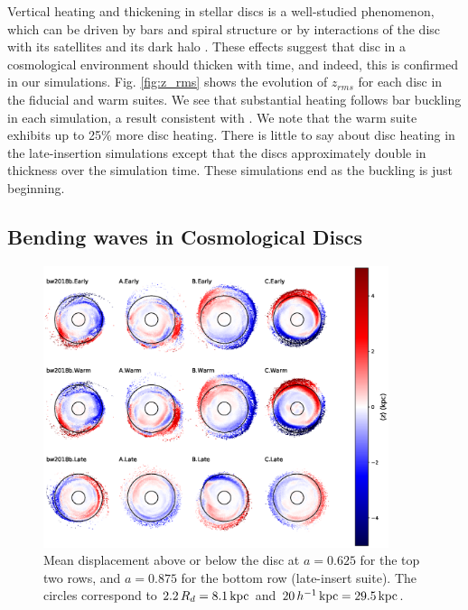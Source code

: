 Vertical heating and thickening in stellar discs is a well-studied
phenomenon, which can be driven by bars and spiral structure
\citep{mcmillan_dehnen_2007,Sellwood2013} or by interactions of the
disc with its satellites and its dark halo \citep[for
  example]{lacey_ostriker_1985, toth_ostriker_1992, sellwood_1998,
  bauer2018b}. These effects suggest that disc in a cosmological
environment should thicken with time, and indeed, this is confirmed in
our simulations.  Fig. \ref{fig:z_rms} shows the evolution of
$z_{rms}$ for each disc in the fiducial and warm suites. We see that
substantial heating follows bar buckling in each simulation, a result
consistent with \citet{gauthier_2006, kazantzidis2008,
  ys_2015,bauer2018b}. We note that the warm suite exhibits up to 25\%
more disc heating. There is little to say about disc heating in the
late-insertion simulations except that the discs approximately double
in thickness over the simulation time. These simulations end as the
buckling is just beginning.

\subsection{Bending waves in Cosmological Discs}

\begin{figure}
    \centering
    \includegraphics[width=0.9\textwidth]{../figures/twelve_panel_displacements_025.eps}
\caption{Mean displacement above or below the disc at $a=0.625$ for
  the top two rows, and $a=0.875$ for the bottom row (late-insert
  suite). The circles correspond to $2.2 \,R_d = 8.1\,\text{kpc}$ and $20 \,
  h^{-1} \, \text{kpc} = 29.5\,\text{kpc}$.  }
	\label{fig:vertical_displacement_map}
\end{figure}

